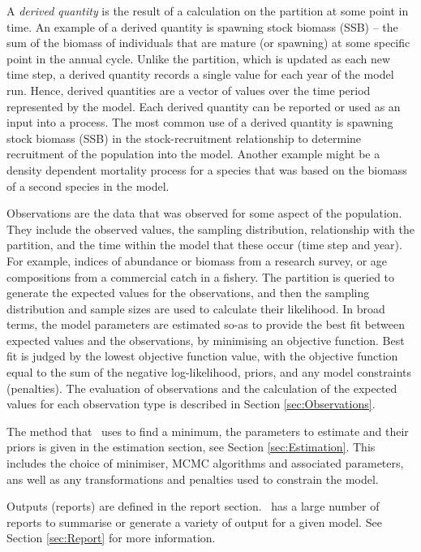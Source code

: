 A \emph{derived quantity} is the result of a calculation on the partition at some point in time. An example of a derived quantity is spawning stock biomass (SSB) -- the sum of the biomass of individuals that are mature (or spawning) at some specific point in the annual cycle. Unlike the partition, which is updated as each new time step, a derived quantity records a single value for each year of the model run. Hence, derived quantities are a vector of values over the time period represented by the model. Each derived quantity can be reported or used as an input into a process. The most common use of a derived quantity is spawning stock biomass (SSB) in the stock-recruitment relationship to determine recruitment of the population into the model. Another example might be a density dependent mortality process for a species that was based on the biomass of a second species in the model.

Observations are the data that was observed for some aspect of the population. They include the observed values, the sampling distribution, relationship with the partition, and the time within the model that these occur (time step and year). For example, indices of abundance or biomass from a research survey, or age compositions from a commercial catch in a fishery. The partition is queried to generate the expected values for the observations, and then the sampling distribution and sample sizes are used to calculate their likelihood. In broad terms, the model parameters are estimated so-as to provide the best fit between expected values and the observations, by minimising an objective function. Best fit is judged by the lowest objective function value, with the objective function equal to the sum of the negative log-likelihood, priors, and any model constraints (penalties). The evaluation of observations and the calculation of the expected values for each observation type is described in Section \ref{sec:Observations}.

The method that \CNAME\ uses to find a minimum, the parameters to estimate and their priors is given in the estimation section, see Section \ref{sec:Estimation}. This includes the choice of minimiser, MCMC algorithms and associated parameters, ans well as any transformations and penalties used to constrain the model. 

Outputs (reports) are defined in the report section. \CNAME\  has a large number of reports to summarise or generate a variety of output for a given model. See Section \ref{sec:Report} for more information.

